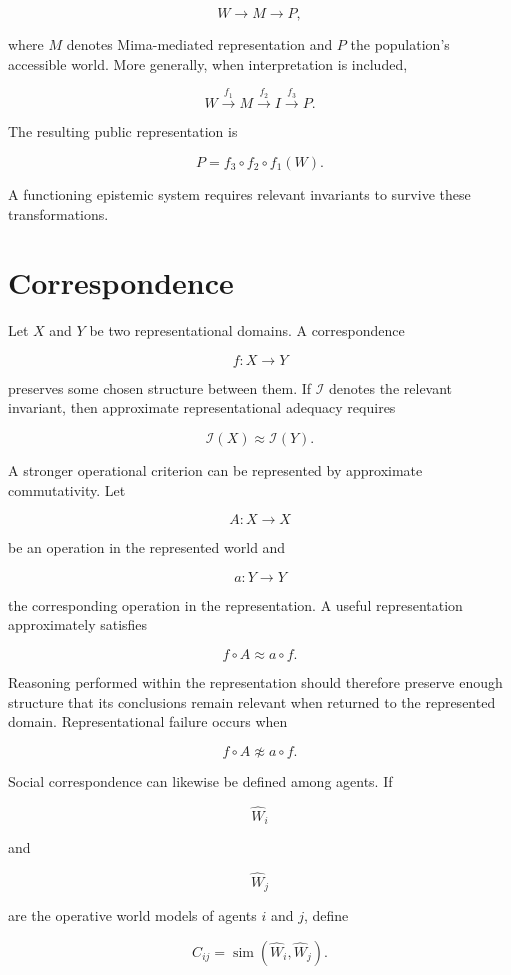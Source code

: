 \documentclass[11pt,oneside]{book}
\theoremstyle{definition}
\theoremstyle{remark}
\begin{document}
\[
W \rightarrow M \rightarrow P,
\]

where \(M\) denotes Mima-mediated representation and \(P\) the population's accessible world. More
generally, when interpretation is included,

\[
W \xrightarrow{f_1} M \xrightarrow{f_2} I \xrightarrow{f_3} P.
\]

The resulting public representation is

\[
P = f_3\circ f_2\circ f_1(W).
\]

A functioning epistemic system requires relevant invariants to survive these transformations.

\section{Correspondence}

Let \(X\) and \(Y\) be two representational domains. A correspondence

\[
f:X\rightarrow Y
\]

preserves some chosen structure between them. If \(\mathcal{I}\) denotes the relevant invariant,
then approximate representational adequacy requires

\[
\mathcal{I}(X) \approx \mathcal{I}(Y).
\]

A stronger operational criterion can be represented by approximate commutativity. Let

\[
A:X\rightarrow X
\]

be an operation in the represented world and

\[
a:Y\rightarrow Y
\]

the corresponding operation in the representation. A useful representation approximately satisfies

\[
f\circ A \approx a\circ f.
\]

Reasoning performed within the representation should therefore preserve enough structure that its
conclusions remain relevant when returned to the represented domain. Representational failure occurs
when

\[
f\circ A \not\approx a\circ f.
\]

Social correspondence can likewise be defined among agents. If

\[
\widehat W_i
\]

and

\[
\widehat W_j
\]

are the operative world models of agents \(i\) and \(j\), define

\[
C_{ij} = \operatorname{sim} (\widehat W_i,\widehat W_j).
\]
\end{document}
